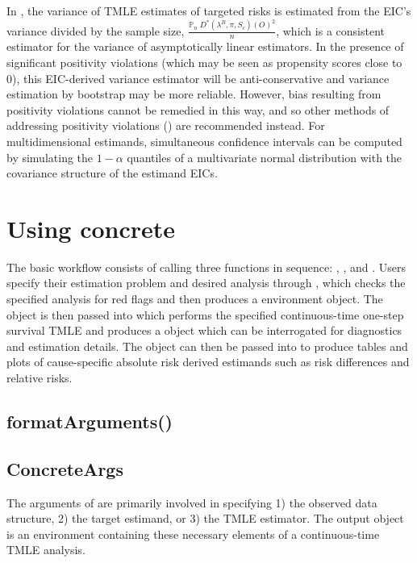 \documentclass{report}
\newcommand{\1}{\ensuremath{\mathbf{1}}}
\newcommand{\g}{\ensuremath{\pi}}
\begin{document}
In , the variance of TMLE estimates of targeted risks is estimated from the EIC's variance divided by the sample size, \(\frac{\mathbb{P}_n \;D^*( \lambda^B, \g, S_c)(O)^2}{n}\), which is a consistent estimator for the variance of asymptotically linear estimators. In the presence of significant positivity violations (which may be seen as propensity scores close to 0), this EIC-derived variance estimator will be anti-conservative and variance estimation by bootstrap may be more reliable. However, bias resulting from positivity violations cannot be remedied in this way, and so other methods of addressing positivity violations (\cite{petersen_diagnosing_2012}) are recommended instead. For multidimensional estimands, simultaneous confidence intervals can be computed by simulating the \(1 - \alpha\) quantiles of a multivariate normal distribution with the covariance structure of the estimand EICs.

\section{Using concrete}
\label{UsingConcrete}
The basic  workflow consists of calling three functions in sequence: , , and . Users specify their estimation problem and desired analysis through , which checks the specified analysis for red flags and then produces a  environment object. The  object is then passed into  which performs the specified continuous-time one-step survival TMLE and produces a  object which can be interrogated for diagnostics and estimation details. The  object can then be passed into  to produce tables and plots of cause-specific absolute risk derived estimands such as risk differences and relative risks. 


\subsection{formatArguments()}
\label{formatArguments}

\subsection{ConcreteArgs}
\label{sec:org2edda5f}
The arguments of  are primarily involved in specifying 1) the observed data structure, 2) the target estimand, or 3) the TMLE estimator. The output  object is an environment containing these necessary elements of a continuous-time TMLE analysis.
\end{document}
